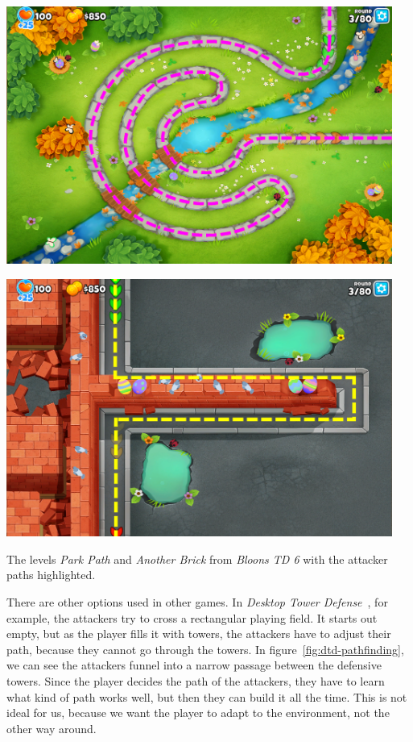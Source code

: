 \begin{center}
    \captionsetup{type=figure}
    \begin{minipage}{.5\textwidth}
        \centering
        \includegraphics[width=0.95\textwidth]{img/Bloons-TD6-Park-Path-Highlighted.png}
    \end{minipage}%
    \begin{minipage}{.5\textwidth}
        \centering
        \includegraphics[width=0.95\textwidth]{img/Bloons-TD6-Another-Brick-Highlighted.png}
    \end{minipage}
    \caption{The levels \emph{Park Path} and \emph{Another Brick} from \emph{Bloons TD 6} with the attacker paths highlighted.}
    \label{fig:btd6-maps}
\end{center}

There are other options used in other games.
In \emph{Desktop Tower Defense}~\cite{DTDWiki}, for example, the attackers try to cross a rectangular playing field.
It starts out empty, but as the player fills it with towers, the attackers have to adjust their path, because they cannot go through the towers.
In figure~\ref{fig:dtd-pathfinding}, we can see the attackers funnel into a narrow passage between the defensive towers.
Since the player decides the path of the attackers, they have to learn what kind of path works well, but then they can build it all the time.
This is not ideal for us, because we want the player to adapt to the environment, not the other way around.

